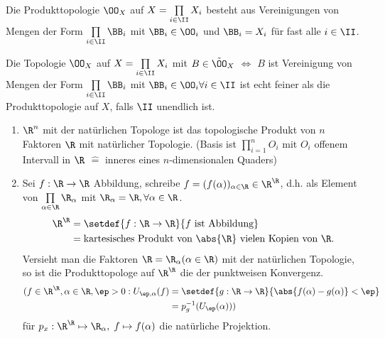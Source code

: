 Die Produkttopologie $\OO_X$ auf $X=\prod\limits_{i\in\II} X_i$ besteht aus
Vereinigungen von Mengen der Form $\prod\limits_{i\in\II}\BB_i$ mit
$\BB_i\in\OO_i$ und $\BB_i =X_i$ für fast alle $i\in \II$.

Die Topologie $\OO_X$ auf $X = \prod\limits_{i\in\II} X_i$ mit
$B\in\tilde{\OO}_X$ $\Leftrightarrow$
$B$ ist Vereinigung von Mengen der Form $\prod\limits_{i\in\II} \BB_i$ mit
$\BB_i\in\OO_i\forall i\in \II$ ist echt feiner als die Produkttopologie auf
$X$, falls $\II$ unendlich ist.

\begin{bsp}
\label{bsp:1.4.3}
\begin{enumerate}
  \item $\R^n$ mit der natürlichen Topologe ist das topologische Produkt von $n$
  Faktoren $\R$ mit natürlicher Topologie. (Basis ist $\prod\limits_{i=1}^n O_i$
  mit $O_i$ offenem Intervall in $\R$ $\mathrel{\widehat{=}}$ inneres eines
  $n$-dimensionalen Quaders)
  \item Sei $f:\R\to\R$ Abbildung, schreibe
  $f=(f(\alpha))_{\alpha\in\R}\in\R^\R$, d.h. als Element von
  $\prod\limits_{\alpha\in\R} \R_\alpha$ mit $\R_\alpha = \R, \forall \alpha\in
  \R$.
  \begin{align*}
  \R^\R &= \setdef{f:\R\to\R}{f \text{ ist Abbildung}} \\ &= \text{kartesisches
  Produkt von $\abs{\R}$ vielen Kopien von $\R$}.
  \end{align*}
Versieht man die Faktoren $\R=\R_\alpha (\alpha\in\R)$ mit der natürlichen
Topologie, so ist die Produkttopologe auf $\R^\R$ die der punktweisen
Konvergenz.
\begin{align*}
(f\in\R^\R,\alpha\in\R, \ep > 0 : U_{\ep,\alpha}(f) &=
\setdef{g:\R\to\R}{\abs{f(\alpha)-g(\alpha)}<\ep} \\ &= p_g^{-1}(U_\ep(\alpha)))
\end{align*}
für $p_x:\R^\R \mapsto \R_\alpha,\;f\mapsto f(\alpha)$ die natürliche
Projektion.\bsphere
\end{enumerate}
\end{bsp}

